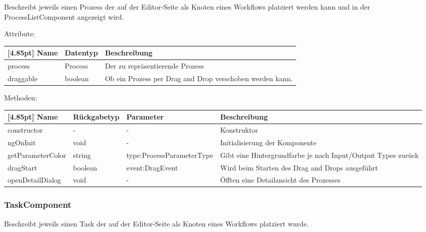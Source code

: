 			Beschreibt jeweils einen Prozess der auf der Editor-Seite als Knoten eines Workflows platziert werden kann und in der ProcessListComponent angezeigt wird.\newline
			
				Attribute:
				\begin{center}
					\renewcommand{\arraystretch}{1.5}
					\setlength\tabcolsep{5pt}
					\begin{tabularx}{\textwidth}{|l|l|X|}
						\hline
						\rowcolor[gray]{0.75}[4.85pt]					
						Name & Datentyp & Beschreibung \\ \hline
						process & Process & Der zu repräsentierende Prozess \\ \hline
						draggable & boolean & Ob ein Prozess per Drag and Drop verschoben werden kann. \\ \hline
					\end{tabularx}
				\end{center}
				
				Methoden:
				\begin{center}
				\setlength\tabcolsep{5pt}
					\renewcommand{\arraystretch}{1.5}
						\begin{tabularx}{\textwidth}{|l|l|p{40mm}|X|}
						\hline
						\rowcolor[gray]{0.75}[4.85pt]
						Name & Rückgabetyp & Parameter & Beschreibung \\ \hline
						constructor & - & - & Konstruktor \\ \hline
						ngOnInit & void & - & Initialisierung der Komponente \\ \hline
						getParameterColor & string & type:\newline ProcessParameterType & Gibt eine Hintergrundfarbe je nach Input/Output Types zurück \\ \hline
						dragStart & boolean & event:DragEvent & Wird beim Starten des Drag and Drops ausgeführt \\ \hline
						openDetailDialog & void & - & Öfften eine Detailansicht des Prozesses \\ \hline
						\end{tabularx}
				\end{center}
			
			\subsubsection{TaskComponent}
			
			Beschreibt jeweils einen Task der auf der Editor-Seite als Knoten eines Workflows platziert wurde.\newline
			
